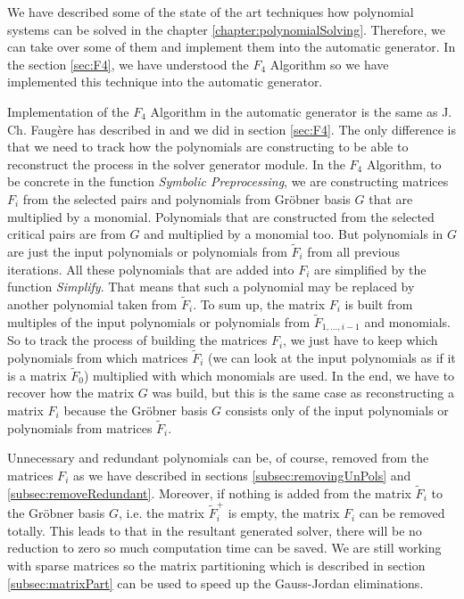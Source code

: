 We have described some of the state of the art techniques how polynomial systems can be solved in the chapter \ref{chapter:polynomialSolving}. Therefore, we can take over some of them and implement them into the automatic generator. In the section \ref{sec:F4}, we have understood the $F_4$ \cite{F4} Algorithm so we have implemented this technique into the automatic generator.

Implementation of the $F_4$ Algorithm in the automatic generator is the same as J. Ch. Faug\`ere has described in \cite{F4} and we did in section \ref{sec:F4}. The only difference is that we need to track how the polynomials are constructing to be able to reconstruct the process in the solver generator module. In the $F_4$ Algorithm, to be concrete in the function \textit{Symbolic Preprocessing}, we are constructing matrices $F_i$ from the selected pairs and polynomials from Gr\"obner basis $G$ that are multiplied by a monomial. Polynomials that are constructed from the selected critical pairs are from $G$ and multiplied by a monomial too. But polynomials in $G$ are just the input polynomials or polynomials from $\tilde{F}_i$ from all previous iterations. All these polynomials that are added into $F_i$ are simplified by the function \textit{Simplify}. That means that such a polynomial may be replaced by another polynomial taken from $\tilde{F}_i$. To sum up, the matrix $F_i$ is built from multiples of the input polynomials or polynomials from $\tilde{F}_{1,\dots, i-1}$ and monomials. So to track the process of building the matrices $F_i$, we just have to keep which polynomials from which matrices $\tilde{F}_i$ (we can look at the input polynomials as if it is a matrix $\tilde{F}_0$) multiplied with which monomials are used. In the end, we have to recover how the matrix $G$ was build, but this is the same case as reconstructing a matrix $F_i$ because the Gr\"obner basis $G$ consists only of the input polynomials or polynomials from matrices $\tilde{F}_i$.

Unnecessary and redundant polynomials can be, of course, removed from the matrices $F_i$ as we have described in sections \ref{subsec:removingUnPols} and \ref{subsec:removeRedundant}. Moreover, if nothing is added from the matrix $\tilde{F}_i$ to the Gr\"obner basis $G$, i.e. the matrix $\tilde{F}_i^+$ is empty, the matrix $F_i$ can be removed totally. This leads to that in the resultant generated solver, there will be no reduction to zero so much computation time can be saved. We are still working with sparse matrices so the matrix partitioning which is described in section \ref{subsec:matrixPart} can be used to speed up the Gauss-Jordan eliminations.

